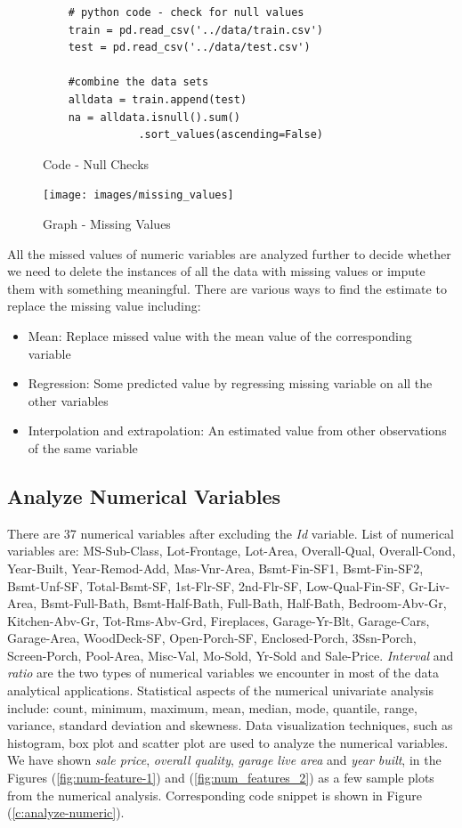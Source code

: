 \documentclass[sigconf]{acmart}
\begin{document}
	\begin{figure}[htb]
	\begin{verbatim}		
	# python code - check for null values
	train = pd.read_csv('../data/train.csv')
	test = pd.read_csv('../data/test.csv')
		
	#combine the data sets
	alldata = train.append(test)	
	na = alldata.isnull().sum()
	           .sort_values(ascending=False)
	\end{verbatim}
	\caption{Code - Null Checks}\label{c:check-nulls}
	\end{figure}
	
	\begin{figure}[htb]
		\centering
		\texttt{[image: images/missing\_values]}	
		\caption{Graph - Missing Values} \label{fig:missing-values} 
	\end{figure}

	All the missed values of numeric variables are analyzed further to decide whether we need to delete the instances of all the data with missing values or impute them with something meaningful. There are various ways to find the estimate to replace the missing value including:  
	
	\begin{itemize}
		\item Mean: Replace missed value with the mean value of the corresponding variable
		\item Regression: Some predicted value by regressing missing variable on all the other variables
		\item Interpolation and extrapolation: An estimated value from other observations of the same variable
	\end{itemize}
    
	\subsection{Analyze Numerical Variables}
    There are 37 numerical variables after excluding the {\em Id} variable. List of numerical variables are: MS-Sub-Class, Lot-Frontage, Lot-Area, Overall-Qual, Overall-Cond, Year-Built, Year-Remod-Add, Mas-Vnr-Area, Bsmt-Fin-SF1, Bsmt-Fin-SF2, Bsmt-Unf-SF, Total-Bsmt-SF, 1st-Flr-SF, 2nd-Flr-SF, Low-Qual-Fin-SF, Gr-Liv-Area, Bsmt-Full-Bath, Bsmt-Half-Bath, Full-Bath, Half-Bath, Bedroom-Abv-Gr, Kitchen-Abv-Gr, Tot-Rms-Abv-Grd, Fireplaces, Garage-Yr-Blt, Garage-Cars, Garage-Area, WoodDeck-SF, Open-Porch-SF, Enclosed-Porch, 3Ssn-Porch, Screen-Porch, Pool-Area, Misc-Val, Mo-Sold, Yr-Sold and Sale-Price. {\em Interval} and {\em ratio} are the two types of numerical variables we encounter in most of the data analytical applications. Statistical aspects of the numerical univariate analysis include: count, minimum, maximum, mean, median, mode, quantile, range, variance, standard deviation and skewness. Data visualization techniques, such as histogram, box plot and scatter plot are used to analyze the numerical variables. We have shown {\em sale price}, {\em overall quality}, {\em garage live area} and {\em year built}, in the Figures (\ref{fig:num-feature-1}) and (\ref{fig:num_features_2}) as a few sample plots from the numerical analysis. Corresponding code snippet is shown in Figure (\ref{c:analyze-numeric}).
	
\end{document}
